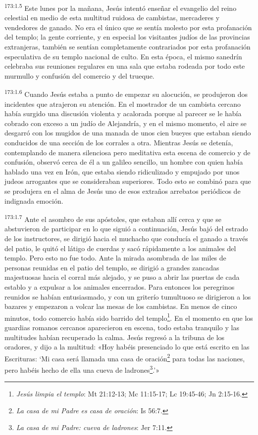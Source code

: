 \par 
\textsuperscript{173:1.5} Este lunes por la mañana, Jesús intentó enseñar el evangelio del reino celestial en medio de esta multitud ruidosa de cambistas, mercaderes y vendedores de ganado. No era el único que se sentía molesto por esta profanación del templo; la gente corriente, y en especial los visitantes judíos de las provincias extranjeras, también se sentían completamente contrariados por esta profanación especulativa de su templo nacional de culto. En esta época, el mismo sanedrín celebraba sus reuniones regulares en una sala que estaba rodeada por todo este murmullo y confusión del comercio y del trueque.

\par 
\textsuperscript{173:1.6} Cuando Jesús estaba a punto de empezar su alocución, se produjeron dos incidentes que atrajeron su atención. En el mostrador de un cambista cercano había surgido una discusión violenta y acalorada porque al parecer se le había cobrado con exceso a un judío de Alejandría, y en el mismo momento, el aire se desgarró con los mugidos de una manada de unos cien bueyes que estaban siendo conducidos de una sección de los corrales a otra. Mientras Jesús se detenía, contemplando de manera silenciosa pero meditativa esta escena de comercio y de confusión, observó cerca de él a un galileo sencillo, un hombre con quien había hablado una vez en Irón, que estaba siendo ridiculizado y empujado por unos judeos arrogantes que se consideraban superiores. Todo esto se combinó para que se produjera en el alma de Jesús uno de esos extraños arrebatos periódicos de indignada emoción.

\par 
\textsuperscript{173:1.7} Ante el asombro de sus apóstoles, que estaban allí cerca y que se abstuvieron de participar en lo que siguió a continuación, Jesús bajó del estrado de los instructores, se dirigió hacia el muchacho que conducía el ganado a través del patio, le quitó el látigo de cuerdas y sacó rápidamente a los animales del templo. Pero esto no fue todo. Ante la mirada asombrada de las miles de personas reunidas en el patio del templo, se dirigió a grandes zancadas majestuosas hacia el corral más alejado, y se puso a abrir las puertas de cada establo y a expulsar a los animales encerrados. Para entonces los peregrinos reunidos se habían entusiasmado, y con un griterío tumultuoso se dirigieron a los bazares y empezaron a volcar las mesas de los cambistas. En menos de cinco minutos, todo comercio había sido barrido del templo\footnote{\textit{Jesús limpia el templo}: Mt 21:12-13; Mc 11:15-17; Lc 19:45-46; Jn 2:15-16.}. En el momento en que los guardias romanos cercanos aparecieron en escena, todo estaba tranquilo y las multitudes habían recuperado la calma. Jesús regresó a la tribuna de los oradores, y dijo a la multitud: «Hoy habéis presenciado lo que está escrito en las Escrituras: `Mi casa será llamada una casa de oración\footnote{\textit{La casa de mi Padre es casa de oración}: Is 56:7.} para todas las naciones, pero habéis hecho de ella una cueva de ladrones\footnote{\textit{La casa de mi Padre: cueva de ladrones}: Jer 7:11.}.'»

